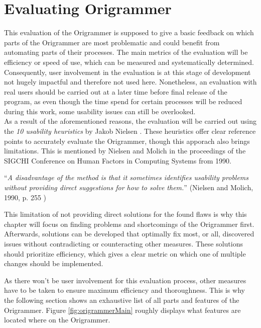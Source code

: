 
\section{Evaluating Origrammer}
\label{sec:evaluation}

This evaluation of the Origrammer is supposed to give a basic feedback on which parts of the Origrammer are most problematic and could benefit from automating parts of their processes. The main metrics of the evaluation will be efficiency or speed of use, which can be measured and systematically determined. Consequently, user involvement in the evaluation is at this stage of development not hugely impactful and therefore not used here. Nonetheless, an evaluation with real users should be carried out at a later time before final release of the program, as even though the time spend for certain processes will be reduced during this work, some usability issues can still be overlooked.\\
\newline
As a result of the aforementioned reasons, the evaluation will be carried out using the \emph{10 usability heuristics} by Jakob Nielsen \cite{10usability_heuristics}. These heuristics offer clear reference points to accurately evaluate the Origrammer, though this apporach also brings limitations. This is mentioned by Nielsen and Molich in the proceedings of the SIGCHI Conference on Human Factors in Computing Systems from 1990.

\begin{center}
\enquote{\emph{A disadvantage of the method is that it sometimes identifies usability problems without providing direct suggestions for how to solve them.}} (Nielsen and Molich, 1990, p. 255 \cite{usability_heuristics})
\end{center}

\noindent This limitation of not providing direct solutions for the found flaws is why this chapter will focus on finding problems and shortcomings of the Origrammer first. Afterwards, solutions can be developed that optimally fix most, or all, discovered issues without contradicting or counteracting other measures. These solutions should prioritize efficiency, which gives a clear metric on which one of multiple changes should be implemented.

As there won't be user involvement for this evaluation process, other measures have to be taken to ensure maximum efficiency and thoroughness. This is why the following section shows an exhaustive list of all parts and features of the Origrammer. Figure \ref{fig:origrammerMain} roughly displays what features are located where on the Origrammer.

